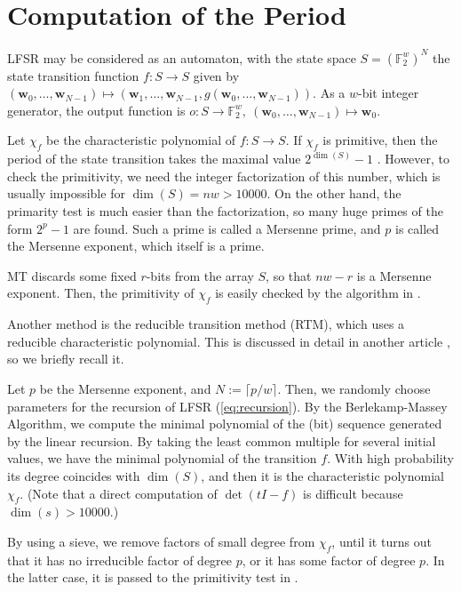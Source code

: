 \documentclass[acmnow]{acmtrans2m}
\def\F2{{\mathbb F}_2}
\def\bw{{{\mathbf w}}}
\begin{document}
\appendix
\section{Computation of  the Period}\label{sec:period}
LFSR may be considered as an automaton, 
with the state space $S=(\F2^{w})^{N}$ 
the state transition function 
$f: S \to S$ given by
$(\bw_0,\ldots,\bw_{N-1})
\mapsto (\bw_1,\ldots,\bw_{N-1}, g(\bw_0,\ldots,\bw_{N-1}))$.  
As a $w$-bit integer generator, the output function is 
$o: S \to \F2^{w},\  (\bw_0,\ldots,\bw_{N-1}) \mapsto \bw_0$.

Let $\chi_f$ be the characteristic polynomial of $f:S \to S$.
If $\chi_f$ is primitive, then the 
period of the state transition takes the maximal value
$2^{\dim(S)}-1$ \cite[\S3.2.2]{knuth:bible}. 
However, to check the primitivity, we need
the integer factorization of this number, which is usually 
impossible for $\dim(S)=nw>10000$. 
On the other hand, the primarity test is much easier than 
the factorization, so many huge primes of the form 
$2^p-1$ are found. 
Such a prime is called a Mersenne prime, and $p$ is
called the Mersenne exponent, which itself is a prime.

MT discards some fixed $r$-bits from the
array $S$, so that $nw-r$ is a Mersenne exponent. 
Then, the primitivity of $\chi_f$ is easily checked
by the algorithm in \cite[\S3.2.2]{knuth:bible}.

Another method is the reducible transition method (RTM), 
which uses a reducible characteristic polynomial.
This is discussed in detail in another article \cite{PMT}, 
so we briefly recall it. 

Let $p$ be the Mersenne exponent, and $N:=\lceil p/w \rceil$.
Then, we randomly choose parameters for the recursion of LFSR
(\ref{eq:recursion}).
By the Berlekamp-Massey Algorithm, 
we compute the minimal polynomial of the (bit) sequence
generated by the linear recursion. By taking the least
common multiple for several initial values, we have the 
minimal polynomial of the transition $f$. With high 
probability its degree coincides with $\dim(S)$, and then
it is the characteristic polynomial $\chi_f$. 
(Note that a direct computation of $\det(tI-f)$ is difficult
 because $\dim(s)>10000$.)

By using a sieve, we remove factors of small degree from $\chi_f$,
until it turns out that it has no irreducible factor of degree $p$,
or it has some factor of degree $p$. In the latter case, it is 
passed to the primitivity test in \cite[\S3.2.2]{knuth:bible}.
\end{document}

